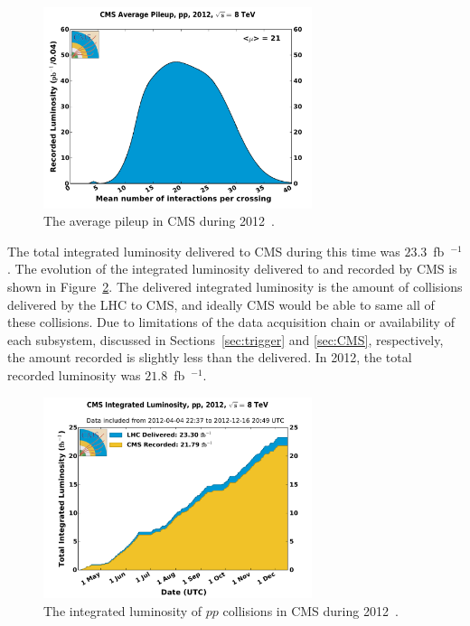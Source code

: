 \begin{figure}[ht]
 \begin{center}
    \includegraphics[width=0.70\textwidth]{figures/experiment/pileup_pp_2012.pdf}
      \end{center}
\caption{The average pileup in CMS during 2012~\cite{CMS:lumi}.}
\label{fig:pileup2012}
\end{figure}

The total integrated luminosity delivered to CMS during this time was $23.3$~fb~$^{-1}$.
The evolution of the integrated luminosity delivered to and recorded by CMS is shown in
Figure~\ref{fig:integratedlumi2012}. The delivered integrated luminosity is the amount of
collisions delivered by the LHC to CMS, and ideally CMS would be able to same all of these collisions.
Due to limitations of the data acquisition chain or availability of each subsystem, discussed in
Sections~\ref{sec:trigger} and \ref{sec:CMS}, respectively, the amount recorded
is slightly less than the delivered. In 2012, the total recorded luminosity was $21.8$~fb~$^{-1}$.

\begin{figure}[ht]
 \begin{center}
    \includegraphics[width=0.70\textwidth]{figures/experiment/int_lumi_per_day_cumulative_pp_2012.pdf}
      \end{center}
\caption{The integrated luminosity of $pp$ collisions in CMS during 2012~\cite{CMS:lumi}.}
\label{fig:integratedlumi2012}
\end{figure}

